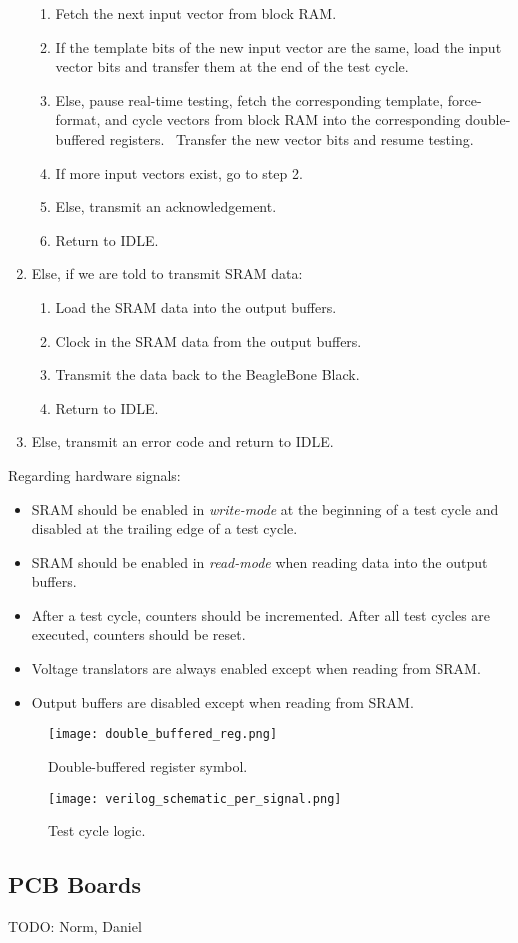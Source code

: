 \begin{enumerate}
\begin{enumerate}[label=\arabic*.]
    \item Fetch the next input vector from block RAM. 
    \item If the template bits of the new input vector are the same, load the input vector bits and transfer them at the end of the test cycle.
    \item Else, pause real-time testing, fetch the corresponding template, force-format, and cycle vectors from block RAM into the corresponding double-buffered registers.
    \ Transfer the new vector bits and resume testing.
    \item If more input vectors exist, go to step 2.
    \item Else, transmit an acknowledgement.
    \item Return to IDLE.
  \end{enumerate}
\item Else, if we are told to transmit SRAM data: 
  \begin{enumerate}[label=\arabic*.]
    \item Load the SRAM data into the output buffers.
    \item Clock in the SRAM data from the output buffers.
    \item Transmit the data back to the BeagleBone Black.
    \item Return to IDLE.
  \end{enumerate}
  \item Else, transmit an error code and return to IDLE.
\end{enumerate}

Regarding hardware signals: 
\begin{itemize}
	\item SRAM should be enabled in \textit{write-mode} at the beginning of a test cycle and disabled at the trailing edge of a test cycle.
	\item SRAM should be enabled in \textit{read-mode} when reading data into the output buffers.
	\item After a test cycle, counters should be incremented. After all test cycles are executed, counters should be reset.
	\item Voltage translators are always enabled except when reading from SRAM.
	\item Output buffers are disabled except when reading from SRAM.
\end{itemize}

\begin{figure}
\texttt{[image: double\_buffered\_reg.png]}
\caption{Double-buffered register symbol.}
\label{fig:double_buf_reg}
\end{figure}

\begin{figure}
\texttt{[image: verilog\_schematic\_per\_signal.png]}
\caption{Test cycle logic.}
\label{fig:test_cycle_logic}
\end{figure}

\subsection{PCB Boards}
TODO: Norm, Daniel
\newpage